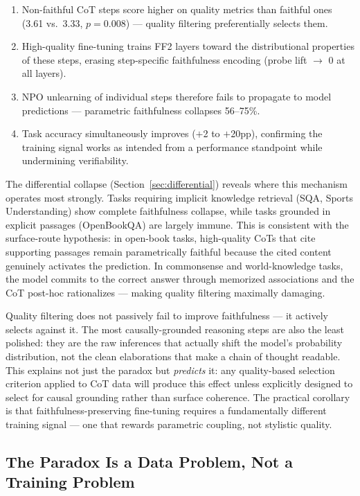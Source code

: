 \documentclass[11pt]{article}
\begin{document}
\begin{enumerate}
  \item Non-faithful CoT steps score higher on quality metrics than faithful
        ones (3.61 vs.\ 3.33, $p = 0.008$) --- quality filtering
        preferentially selects them.
  \item High-quality fine-tuning trains FF2 layers toward the distributional
        properties of these steps, erasing step-specific faithfulness encoding
        (probe lift $\to$ 0 at all layers).
  \item NPO unlearning of individual steps therefore fails to propagate to
        model predictions --- parametric faithfulness collapses 56--75\%.
  \item Task accuracy simultaneously improves ($+$2 to $+$20pp), confirming
        the training signal works as intended from a performance standpoint
        while undermining verifiability.
\end{enumerate}

The differential collapse (Section~\ref{sec:differential}) reveals where
this mechanism operates most strongly. Tasks requiring implicit knowledge
retrieval (SQA, Sports Understanding) show complete faithfulness collapse,
while tasks grounded in explicit passages (OpenBookQA) are largely immune.
This is consistent with the surface-route hypothesis: in open-book tasks,
high-quality CoTs that cite supporting passages remain parametrically faithful
because the cited content genuinely activates the prediction. In commonsense
and world-knowledge tasks, the model commits to the correct answer through
memorized associations and the CoT post-hoc rationalizes --- making quality
filtering maximally damaging.

Quality filtering does not passively fail to improve faithfulness --- it
actively selects against it. The most causally-grounded reasoning steps are
also the least polished: they are the raw inferences that actually shift the
model's probability distribution, not the clean elaborations that make a chain
of thought readable. This explains not just the paradox but \emph{predicts}
it: any quality-based selection criterion applied to CoT data will produce this
effect unless explicitly designed to select for causal grounding rather than
surface coherence. The practical corollary is that faithfulness-preserving
fine-tuning requires a fundamentally different training signal --- one that
rewards parametric coupling, not stylistic quality.

\subsection{The Paradox Is a Data Problem, Not a Training Problem}
\end{document}
